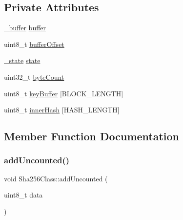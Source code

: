 \subsection*{Private Attributes}
\begin{DoxyCompactItemize}
\item 
\hyperlink{union__buffer}{\+\_\+buffer} \hyperlink{classSha256Class_af8b8cc54c6a6d49740a46f080a4c192b}{buffer}
\item 
uint8\+\_\+t \hyperlink{classSha256Class_a867b0496a2013dbc43e62a672e73394e}{buffer\+Offset}
\item 
\hyperlink{union__state}{\+\_\+state} \hyperlink{classSha256Class_a8dc721620a543ed0f9c2015b07aefe0e}{state}
\item 
uint32\+\_\+t \hyperlink{classSha256Class_ab66aee87718acd5bd8546dadb8cf6cf7}{byte\+Count}
\item 
uint8\+\_\+t \hyperlink{classSha256Class_a067a077fcf1396d44dfbc7cf1f646ca1}{key\+Buffer} \mbox{[}B\+L\+O\+C\+K\+\_\+\+L\+E\+N\+G\+TH\mbox{]}
\item 
uint8\+\_\+t \hyperlink{classSha256Class_ac7f65171164cfc576b718a8fcb3a3f0b}{inner\+Hash} \mbox{[}H\+A\+S\+H\+\_\+\+L\+E\+N\+G\+TH\mbox{]}
\end{DoxyCompactItemize}


\subsection{Member Function Documentation}
\mbox{\label{classSha256Class_ab0b46743e3d59b1c68f52ed89dfaff50}} 
\subsubsection{\texorpdfstring{add\+Uncounted()}{addUncounted()}}
{\footnotesize\ttfamily void Sha256\+Class\+::add\+Uncounted (\begin{DoxyParamCaption}\item[{uint8\+\_\+t}]{data }\end{DoxyParamCaption})\hspace{0.3cm}{\ttfamily [private]}}

\mbox{\label{classSha256Class_a399d2a23951e2130f54af8ac7712068f}} 
